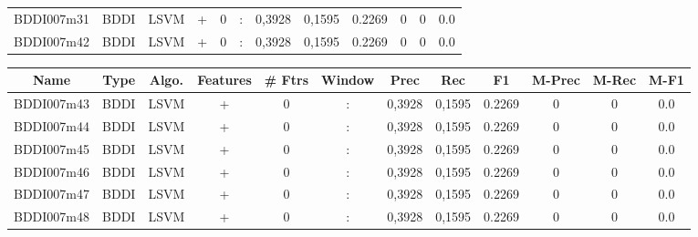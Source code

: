\documentclass[a4paper]{article}
\begin{document}
\begin{landscape}
\begin{center}
\begin{tabular}{ |c|c|c|c|c|c|c|c|c|c|c|c|}
 	
 
 	
 		
 		\small{ BDDI007m31 } & BDDI & LSVM & +  &  0 &  :  &  0,3928 & 0,1595 & 0.2269  &  0 & 0 & 0.0 \\
 		

 	
 
 	
 		
 		\small{ BDDI007m42 } & BDDI & LSVM & +  &  0 &  :  &  0,3928 & 0,1595 & 0.2269  &  0 & 0 & 0.0 \\
 		
 \hline
\end{tabular}
\end{center}




\begin{center}
\begin{tabular}{ |c|c|c|c|c|c|c|c|c|c|c|c|} 
 \hline
 	Name & Type & Algo. & Features & \# Ftrs & Window & Prec & Rec & F1 & M-Prec & M-Rec & M-F1\\
 \hline

 		

 	
 
 	
 		
 		\small{ BDDI007m43 } & BDDI & LSVM & +  &  0 &  :  &  0,3928 & 0,1595 & 0.2269  &  0 & 0 & 0.0 \\
 		

 	
 
 	
 		
 		\small{ BDDI007m44 } & BDDI & LSVM & +  &  0 &  :  &  0,3928 & 0,1595 & 0.2269  &  0 & 0 & 0.0 \\
 		

 	
 
 	
 		
 		\small{ BDDI007m45 } & BDDI & LSVM & +  &  0 &  :  &  0,3928 & 0,1595 & 0.2269  &  0 & 0 & 0.0 \\
 		

 	
 
 	
 		
 		\small{ BDDI007m46 } & BDDI & LSVM & +  &  0 &  :  &  0,3928 & 0,1595 & 0.2269  &  0 & 0 & 0.0 \\
 		

 	
 
 	
 		
 		\small{ BDDI007m47 } & BDDI & LSVM & +  &  0 &  :  &  0,3928 & 0,1595 & 0.2269  &  0 & 0 & 0.0 \\
 		

 	
 
 	
 		
 		\small{ BDDI007m48 } & BDDI & LSVM & +  &  0 &  :  &  0,3928 & 0,1595 & 0.2269  &  0 & 0 & 0.0 \\
 		


\end{tabular}
\end{center}
\end{landscape}
\end{document}

